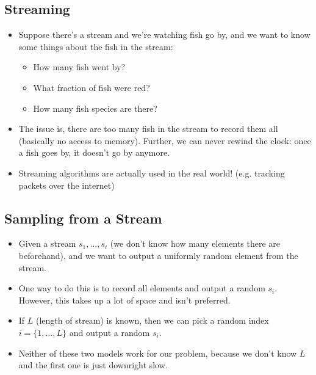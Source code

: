 \subsection{Streaming}
\begin{itemize}
	\item Suppose there's a stream and we're watching fish go by, and we want to know some things about the 
		fish in the stream:
		\begin{itemize}
			\item How many fish went by?
			\item What fraction of fish were red?
			\item How many fish species are there?
		\end{itemize}
	\item The issue is, there are too many fish in the stream to record them all (basically no access to memory).
		Further, we can never rewind the clock: once a fish goes by, it doesn't go by anymore. 
	\item Streaming algorithms are actually used in the real world! (e.g. tracking packets over the internet)
\end{itemize}
\subsection{Sampling from a Stream}
\begin{itemize}
	\item Given a stream \( s_1, \dots, s_i \) (we don't know how many elements there are beforehand), and we want
		to output a uniformly random element from the stream.
	\item One way to do this is to record all elements and output a random \( s_i \). However, this takes 
		up a lot of space and isn't preferred.
	\item If \( L \) (length of stream) is known, then we can pick a random index \( i = \{1, \dots, L\}  \) 
		and output a random \( s_i \). 
	\item Neither of these two models work for our problem, because we don't know \( L \) and the first one 
		is just downright slow.
\end{itemize}

